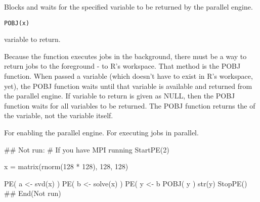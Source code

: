 \documentclass{article}
\begin{document}
\begin{Description}\relax
Blocks and waits for the specified variable to be returned by the
parallel engine.
\end{Description}
\begin{Usage}
\begin{verbatim}
POBJ(x)
\end{verbatim}
\end{Usage}
\begin{Arguments}
\begin{ldescription}
\item[\code{x}] variable to return. 
\end{ldescription}
\end{Arguments}
\begin{Details}\relax
Because the  function executes jobs in the background,
there must be a way to return jobs to the foreground - to R's workspace.
That method is the POBJ function.  When passed a variable (which doesn't
have to exist in R's workspace, yet), the POBJ function waits until that
variable is available and returned from the parallel engine.
If variable to return is given as NULL, then the POBJ function waits for
all variables to be returned.
The POBJ function returns the  of the variable, not the
variable itself.
\end{Details}
\begin{SeeAlso}\relax
{}  For enabling the parallel engine.
  For executing jobs in parallel.
\end{SeeAlso}
\begin{Examples}
\begin{ExampleCode}
## Not run: 
# If you have MPI running
StartPE(2)

x = matrix(rnorm(128 * 128), 128, 128)

PE( a <- svd(x) )
PE( b <- solve(x) )
PE( y <- b %
POBJ( y )
str(y)
StopPE()
## End(Not run)
\end{ExampleCode}
\end{Examples}
\end{document}
